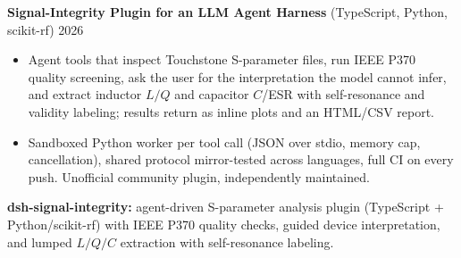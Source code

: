 \textbf{Signal-Integrity Plugin for an LLM Agent Harness} (TypeScript, Python, scikit-rf) \hfill 2026
\begin{itemize}
  \item Agent tools that inspect Touchstone S-parameter files, run IEEE P370
        quality screening, ask the user for the interpretation the model cannot
        infer, and extract inductor $L/Q$ and capacitor $C$/ESR with
        self-resonance and validity labeling; results return as inline plots
        and an HTML/CSV report.
  \item Sandboxed Python worker per tool call (JSON over stdio, memory cap,
        cancellation), shared protocol mirror-tested across languages, full CI
        on every push. Unofficial community plugin, independently maintained.
\end{itemize}

\textbf{dsh-signal-integrity:} agent-driven S-parameter analysis plugin
(TypeScript + Python/scikit-rf) with IEEE P370 quality checks, guided device
interpretation, and lumped $L/Q/C$ extraction with self-resonance labeling.

